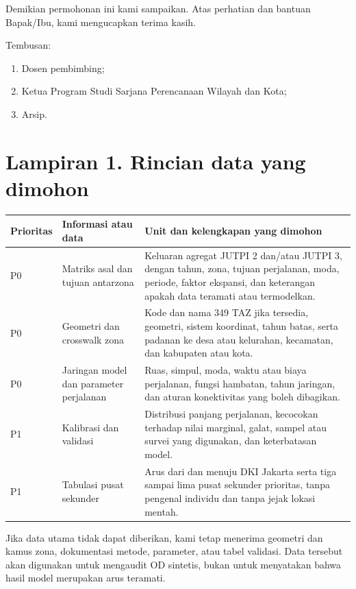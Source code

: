 \documentclass[12pt]{article}
\begin{document}
\PernyataanTanpaBiaya

Demikian permohonan ini kami sampaikan. Atas perhatian dan bantuan Bapak/Ibu, kami mengucapkan terima kasih.

\vspace{8pt}
Tembusan:
\begin{enumerate}
  \item Dosen pembimbing;
  \item Ketua Program Studi Sarjana Perencanaan Wilayah dan Kota;
  \item Arsip.
\end{enumerate}

\TandaTanganDTAP

\clearpage
\section*{Lampiran 1. Rincian data yang dimohon}

\renewcommand{\arraystretch}{1.25}
\begin{tabularx}{\textwidth}{@{}P{0.12\textwidth}P{0.34\textwidth}Y@{}}
\toprule
Prioritas & Informasi atau data & Unit dan kelengkapan yang dimohon \\
\midrule
P0 & Matriks asal dan tujuan antarzona & Keluaran agregat JUTPI 2 dan/atau JUTPI 3, dengan tahun, zona, tujuan perjalanan, moda, periode, faktor ekspansi, dan keterangan apakah data teramati atau termodelkan. \\
P0 & Geometri dan crosswalk zona & Kode dan nama 349 TAZ jika tersedia, geometri, sistem koordinat, tahun batas, serta padanan ke desa atau kelurahan, kecamatan, dan kabupaten atau kota. \\
P0 & Jaringan model dan parameter perjalanan & Ruas, simpul, moda, waktu atau biaya perjalanan, fungsi hambatan, tahun jaringan, dan aturan konektivitas yang boleh dibagikan. \\
P1 & Kalibrasi dan validasi & Distribusi panjang perjalanan, kecocokan terhadap nilai marginal, galat, sampel atau survei yang digunakan, dan keterbatasan model. \\
P1 & Tabulasi pusat sekunder & Arus dari dan menuju DKI Jakarta serta tiga sampai lima pusat sekunder prioritas, tanpa pengenal individu dan tanpa jejak lokasi mentah. \\
\bottomrule
\end{tabularx}

\vspace{8pt}
Jika data utama tidak dapat diberikan, kami tetap menerima geometri dan kamus zona, dokumentasi metode, parameter, atau tabel validasi. Data tersebut akan digunakan untuk mengaudit OD sintetis, bukan untuk menyatakan bahwa hasil model merupakan arus teramati.
\end{document}

